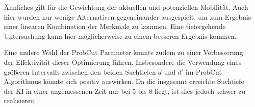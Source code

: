 Ähnliches gilt für die Gewichtung der aktuellen und potenziellen Mobilität. Auch hier wurden nur wenige Alternativen
gegeneinander ausgespielt, um zum Ergebnis einer linearen Kombination der Merkmale zu kommen. Eine tiefergehende
Untersuchung kann hier möglicherweise zu einem besseren Ergebnis kommen.

Eine andere Wahl der ProbCut Parameter könnte zudem zu einer Verbesserung der Effektivität dieser Optimierung führen.
Insbesondere die Verwendung eines größeren Intervalls zwischen den beiden Suchtiefen \(d\) und \(d'\) im ProbCut
Algorithmus könnte sich positiv auswirken. Da die insgesamt erreichte Suchtiefe der KI in einer angemessenen Zeit
nur bei 5 bis 8 liegt, ist dies jedoch schwer zu realisieren.

